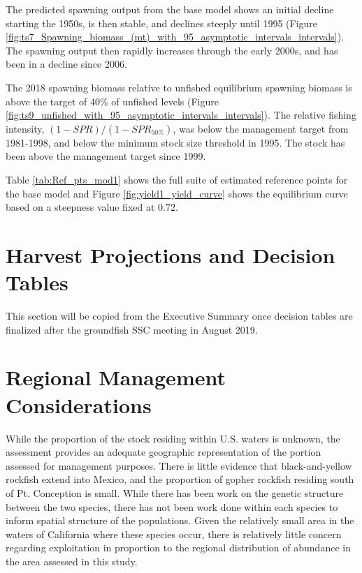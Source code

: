 \documentclass[12pt,]{article}
\begin{document}
The predicted spawning output from the base model shows an initial
decline starting the 1950s, is then stable, and declines steeply until
1995 (Figure
\ref{fig:ts7_Spawning_biomass_(mt)_with_95_asymptotic_intervals_intervals}).
The spawning output then rapidly increases through the early 2000s, and
has been in a decline since 2006.

The 2018 spawning biomass relative to unfished equilibrium spawning
biomass is above the target of 40\% of unfished levels (Figure
\ref{fig:ts9_unfished_with_95_asymptotic_intervals_intervals}). The
relative fishing intensity, \((1-SPR)/(1-SPR_{50\%})\), was below the
management target from 1981-1998, and below the minimum stock size
threshold in 1995. The stock has been above the management target since
1999.

Table \ref{tab:Ref_pts_mod1} shows the full suite of estimated reference
points for the base model and Figure \ref{fig:yield1_yield_curve} shows
the equilibrium curve based on a steepness value fixed at 0.72.

\section{Harvest Projections and Decision
Tables}\label{harvest-projections-and-decision-tables}

This section will be copied from the Executive Summary once decision
tables are finalized after the groundfish SSC meeting in August 2019.

\section{Regional Management
Considerations}\label{regional-management-considerations}

While the proportion of the stock residing within U.S. waters is
unknown, the assessment provides an adequate geographic representation
of the portion assessed for management purposes. There is little
evidence that black-and-yellow rockfish extend into Mexico, and the
proportion of gopher rockfish residing south of Pt. Conception is small.
While there has been work on the genetic structure between the two
species, there has not been work done within each species to inform
spatial structure of the populations. Given the relatively small area in
the waters of California where these species occur, there is relatively
little concern regarding exploitation in proportion to the regional
distribution of abundance in the area assessed in this study.
\end{document}
